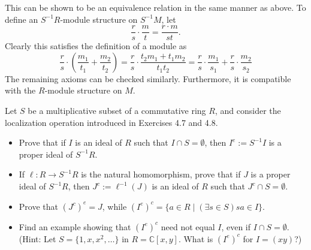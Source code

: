 \documentclass[../../master.tex]{subfiles}
\begin{document}
    \begin{solution}
        This can be shown to be an equivalence relation in the same manner as
        above. To define an $S^{-1}R$-module structure on $S^{-1}M$, let
        \[
        \frac{r}{s} \cdot \frac{m}{t} = \frac{r \cdot m}{st}.
        \] 
        Clearly this satisfies the definition of a module as
        \[
            \frac{r}{s} \cdot \left(\frac{m_1}{t_1} + \frac{m_2}{t_2}\right) =
            \frac{r}{s} \cdot \frac{t_2 m_1 + t_1 m_2}{t_1 t_2} = \frac{r}{s}
            \cdot \frac{m_1}{s_1} + \frac{r}{s} \cdot \frac{m_2}{s_2}
        \]
        The remaining axioms can be checked similarly. Furthermore, it is
        compatible with the $R$-module structure on $M$.
    \end{solution}

    \begin{problem}
        Let $S$ be a multiplicative subset of a commutative ring $R$, and consider
        the localization operation introduced in Exercises 4.7 and 4.8.
        \begin{itemize}
            \item Prove that if $I$ is an ideal of $R$ such that $I \cap S =
                \emptyset$, then $I^{e} := S^{-1}I$ is a proper ideal of $S^{-1}R$.
            \item If $\ell: R \to S^{-1}R$ is the natural homomorphism, prove that
                if $J$ is a proper ideal of $S^{-1}R$, then $J^{c} := \ell^{-1}(J)$
                is an ideal of $R$ such that $J^{c} \cap S = \emptyset$.
            \item Prove that $\left(J^{c}\right)^{e} = J$, while
                $\left(I^{e}\right)^{c} = \{a \in R \mid (\exists s \in S) sa \in
                I\}$.
            \item Find an example showing that $\left(I^{e}\right)^{c}$ need not
                equal $I$, even if $I \cap S = \emptyset$. (Hint: Let $S = \{1, x,
                x^2, \ldots\}$ in $R = \mathbb{C}[x, y]$. What is $(I^{e})^{c}$ for
                $I = (xy)$?)
        \end{itemize}
    \end{problem}
\end{document}
